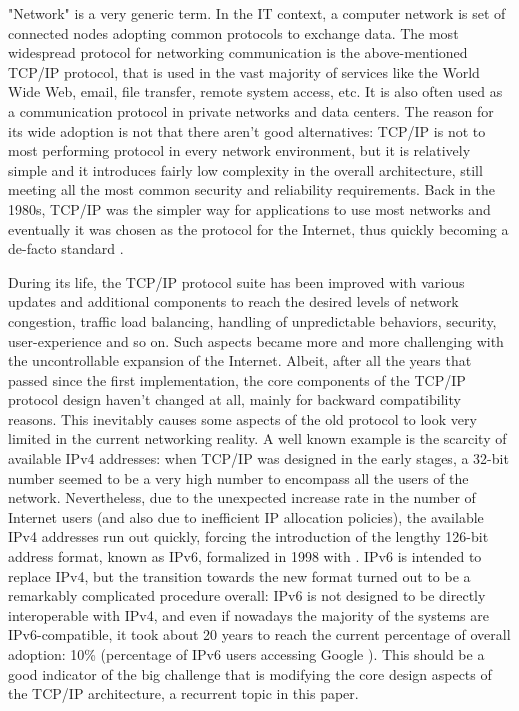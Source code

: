 "Network" is a very generic term. In the IT context, a computer network is set of connected nodes adopting common protocols to exchange data. The most widespread protocol for networking communication is the above-mentioned TCP/IP protocol, that is used in the vast majority of services like the World Wide Web, email, file transfer, remote system access, etc. It is also often used as a communication protocol in private networks and data centers.
The reason for its wide adoption is not that there aren't good alternatives: TCP/IP is not to most performing protocol in every network environment, but it is relatively simple and it introduces fairly low complexity in the overall architecture, still meeting all the most common security and reliability requirements. Back in the 1980s, TCP/IP was the simpler way for applications to use most networks and eventually it was chosen as the protocol for the Internet, thus quickly becoming a de-facto standard \cite{computerworld}. 

During its life, the TCP/IP protocol suite has been improved with various updates and additional components to reach the desired levels of network congestion, traffic load balancing, handling of unpredictable behaviors, security, user-experience and so on. Such aspects became more and more challenging with the uncontrollable expansion of the Internet. 
Albeit, after all the years that passed since the first implementation, the core components of the TCP/IP protocol design haven't changed at all, mainly for backward compatibility reasons. This inevitably causes some aspects of the old protocol to look very limited in the current networking reality. A well known example is the scarcity of available IPv4 addresses: when TCP/IP was designed in the early stages, a 32-bit number seemed to be a very high number to encompass all the users of the network. Nevertheless, due to the unexpected increase rate in the number of Internet users (and also due to inefficient IP allocation policies), the available IPv4 addresses run out quickly, forcing the introduction of the lengthy 126-bit address format, known as IPv6, formalized in 1998 with . IPv6 is intended to replace IPv4, but the transition towards the new format turned out to be a remarkably complicated procedure overall: IPv6 is not designed to be directly interoperable with IPv4, and even if nowadays the majority of the systems are IPv6-compatible, it took about 20 years to reach the current percentage of overall adoption: 10\% (percentage of IPv6 users accessing Google \cite{google}). This should be a good indicator of the big challenge that is modifying the core design aspects of the TCP/IP architecture, a recurrent topic in this paper.

